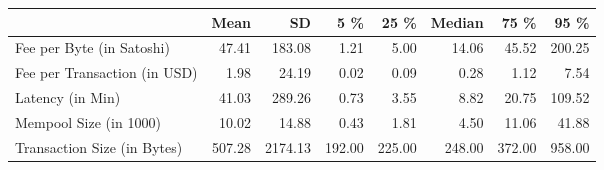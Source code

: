 \begin{tabular}{lrrrrrrr}
  \toprule
  & Mean & SD & 5 \% & 25 \% & Median & 75 \% & 95 \% \\ 
  \midrule
Fee per Byte (in Satoshi) & 47.41 & 183.08 & 1.21 & 5.00 & 14.06 & 45.52 & 200.25 \\ 
  Fee per Transaction (in USD) & 1.98 & 24.19 & 0.02 & 0.09 & 0.28 & 1.12 & 7.54 \\ 
  Latency (in Min) & 41.03 & 289.26 & 0.73 & 3.55 & 8.82 & 20.75 & 109.52 \\ 
  Mempool Size (in 1000) & 10.02 & 14.88 & 0.43 & 1.81 & 4.50 & 11.06 & 41.88 \\ 
  Transaction Size (in Bytes) & 507.28 & 2174.13 & 192.00 & 225.00 & 248.00 & 372.00 & 958.00 \\ 
   \bottomrule
\end{tabular}
